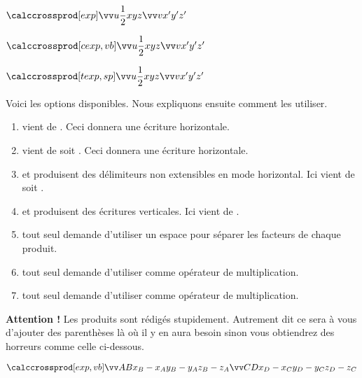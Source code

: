 \documentclass[12pt,a4paper]{article}
\begin{document}
\begin{latexex}
$\vcalccrossprod[exp]%
                {u}{\dfrac{1}{2}x}{y}{z}%
                {v}{x'}{y'}{z'}$

$\vcalccrossprod[cexp,vb]%
                {u}{\dfrac{1}{2}x}{y}{z}%
                {v}{x'}{y'}{z'}$

$\vcalccrossprod[texp,sp]%
                {u}{\dfrac{1}{2}x}{y}{z}%
                {v}{x'}{y'}{z'}$
\end{latexex}


\medskip


Voici les options disponibles. Nous expliquons ensuite comment les utiliser.
\begin{enumerate}
	\item {} vient de . Ceci donnera une écriture horizontale.

	\item {} vient de  soit . Ceci donnera une écriture horizontale.

	\item {} et  produisent des délimiteurs non extensibles en mode horizontal.
	      Ici  vient de  soit .

	\item {} et  produisent des écritures verticales.
	      Ici  vient de .

	\medskip

	\item {} tout seul demande d'utiliser un espace pour séparer les facteurs de chaque produit.

	\item {} tout seul demande d'utiliser  comme opérateur de multiplication.

	\item {} tout seul demande d'utiliser  comme opérateur de multiplication.
\end{enumerate}

\bigskip


\textbf{Attention !}
Les produits sont rédigés stupidement. Autrement dit ce sera à vous d'ajouter des parenthèses là où il y en aura besoin sinon vous obtiendrez des horreurs comme celle ci-dessous.
    
\begin{latexex}
$\vcalccrossprod[exp,vb]%
 {AB}%
 {x_B - x_A}{y_B - y_A}{z_B - z_A}%
 {CD}%
 {x_D - x_C}{y_D - y_C}{z_D - z_C}$
\end{latexex}
\end{document}
